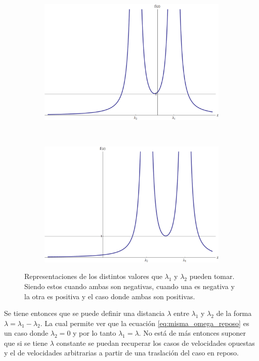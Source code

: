 \documentclass[12pt]{article}
\begin{document}
\begin{figure}[h]
 \begin{subfigure}[b]{0.4\textwidth}
 \includegraphics[width=\textwidth]{grafica_lambas_alternadas.png}
 \caption{}
 \label{fig:lamdas_alternadas}
 \end{subfigure}
 ~
  \begin{subfigure}[b]{0.4\textwidth}
 \includegraphics[width=\textwidth]{grafica_lambas_positivas.png}
  \caption{}
 \label{fig:lamdas_positivas}
 \end{subfigure}
 \caption{Representaciones de los distintos valores que $\lambda_1$ y $\lambda_2$ pueden tomar. Siendo estos cuando ambas son negativas, cuando una es negativa y la otra es positiva y el caso donde ambas son positivas.}\label{fig:valores_lambda}
\end{figure}
Se tiene entonces que se puede definir una distancia $\lambda$ entre $\lambda_1$ y $\lambda_2$ de la forma $\lambda = \lambda_1 - \lambda_2$. La cual permite ver que la ecuación \ref{eq:misma_omega_reposo} es un caso donde $\lambda_2 =0$ y por lo tanto $\lambda_1 = \lambda$. No está de más entonces suponer que si se tiene $\lambda$ constante se puedan recuperar los casos de velocidades opuestas y el de velocidades arbitrarias a partir de una traslación del caso en reposo.\\
\end{document}
